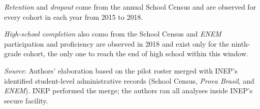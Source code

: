 \begin{table}[h!]
\begin{threeparttable}
\begin{tablenotes}
\item \textit{Retention} and \textit{dropout} come from the annual School Census and are observed for every cohort in each year from 2015 to 2018. 
\item \textit{High-school completion} also como from the School Census and \textit{ENEM} participation and proficiency are observed in 2018 and exist only for the ninth-grade cohort, the only one to reach the end of high school within this window.
\item \textit{Source}: Authors' elaboration based on the pilot roster merged with INEP's identified student-level administrative records (School Census, \textit{Prova Brasil}, and \textit{ENEM}). INEP performed the merge; the authors ran all analyses inside INEP's secure facility.
\end{tablenotes}
\end{threeparttable}
\end{table}%
